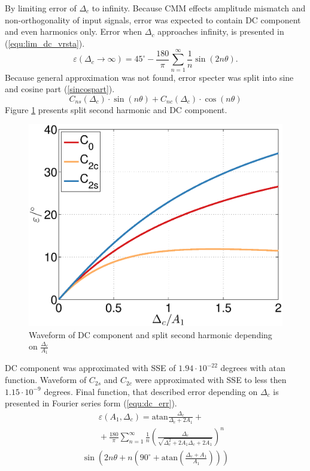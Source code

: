 \documentclass[a4paper]{article}
\begin{document}
By limiting error of $\Delta_c$ to infinity.
Because CMM effects amplitude mismatch and non-orthogonality of input signals, error was expected to contain DC component and even harmonics only.
Error when $\Delta_c$ approaches infinity, is presented in (\ref{equ:lim_dc_vrsta}).
\begin{equation}
\label{equ:lim_dc_vrsta}
\varepsilon(\Delta_c \rightarrow \infty) = 45^\circ -\frac{180}{\pi}\sum_{n=1}^{\infty}\frac{1}{n} \sin( 2 n \theta).
\end{equation}
Because general approximation was not found, error specter was split into sine and cosine part (\ref{sincospart}).
\begin{equation}
\label{sincospart}
C_{ns}(\Delta_c) \cdot\sin(n\theta)+C_{nc}(\Delta_c) \cdot\cos(n\theta)
\end{equation}
Figure \ref{fig:dc} presents split second harmonic and DC component.
\begin{figure}[!htb]
	\begin{center}
		\includegraphics[width=\linewidth]{./Slike/dc.eps}
		\caption{Waveform of DC component and split second harmonic depending on $\frac{\Delta_{c}}{A_1}$} \label{fig:dc}
	\end{center}
\end{figure}

DC component was approximated with SSE of $1.94 \cdot 10^{-22}$ degrees with atan function. Waveform of $C_{2s}$ and $C_{2c}$ were approximated with SSE to less then $1.15 \cdot 10^{-9}$ degrees.
Final function, that described error depending on $\Delta_c$ is presented in Fourier series form (\ref{equ:dc_err}).
\begin{multline}
\label{equ:dc_err}
\qquad\varepsilon(A_1, \Delta_c) = \mathrm{atan}\frac{\Delta_c}{\Delta_c+2 A_1}+\\
\qquad+\frac{180}{\pi} \sum_{n=1}^{\infty}\frac{1}{n} (\frac{\Delta_c}{\sqrt{\Delta_c^2+2 A_1 \Delta_c+2 A_1}})^n\\ \sin (2n \theta+n (90^\circ+ \mathrm{ atan}(\frac{\Delta_c+A_1}{A_1})))
\end{multline}
\end{document}
